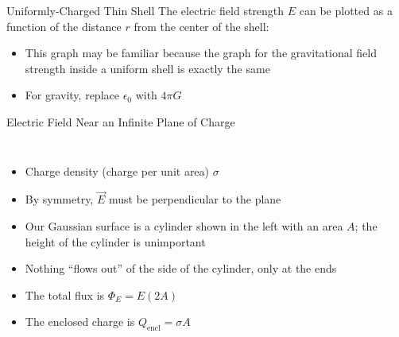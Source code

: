 \documentclass[12pt,aspectratio=169]{beamer}
\begin{document}
\begin{frame}{Uniformly-Charged Thin Shell}
  The electric field strength $E$ can be plotted as a function of the distance
  $r$ from the center of the shell:
  \begin{center}
  \end{center}
  \begin{itemize}
  \item This graph may be familiar because the graph for the gravitational field
    strength inside a uniform shell is exactly the same
  \item For gravity, replace $\epsilon_0$ with $4\pi G$
  \end{itemize}
\end{frame}






\begin{frame}{Electric Field Near an Infinite Plane of Charge}
  \begin{columns}

    \begin{itemize}
    \item Charge density (charge per unit area) $\sigma$
    \item By symmetry, $\vec E$ must be perpendicular to the plane
    \item Our Gaussian surface is a cylinder shown in the left with an area
      $A$; the height of the cylinder is unimportant
    \item Nothing ``flows out'' of the side of the cylinder, only at the ends
    \item The total flux is $\Phi_E=E(2A)$
    \item The enclosed charge is $Q_\text{encl}=\sigma A$
    \end{itemize}
  \end{columns}
\end{frame}
\end{document}
